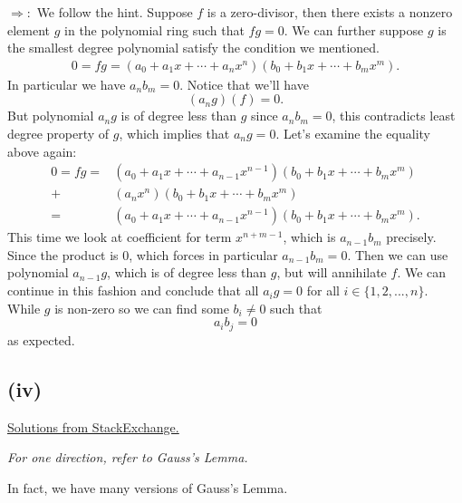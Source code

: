 $\Rightarrow:$ We follow the hint. Suppose $f$ is a zero-divisor, then there exists a nonzero element $g$ in the polynomial ring such that $fg=0$. We can further suppose $g$ is the smallest degree polynomial satisfy the condition we mentioned.
\begin{align*}
    0=fg=(a_0+a_1x+\cdots+a_nx^n)(b_0+b_1x+\cdots+b_mx^m).
\end{align*}In particular we have $a_nb_m=0$. Notice that we'll have 
$$(a_ng)(f)=0.$$ But polynomial $a_ng$ is of degree less than $g$ since $a_nb_m=0$, this contradicts least degree property of $g$, which implies that $a_ng=0$.
Let's examine the equality above again: \begin{align*}
    0=fg=&(a_0+a_1x+\cdots+a_{n-1}x^{n-1})(b_0+b_1x+\cdots+b_mx^m)\\
    +&(a_nx^n)(b_0+b_1x+\cdots+b_mx^m)\\
    =&(a_0+a_1x+\cdots+a_{n-1}x^{n-1})(b_0+b_1x+\cdots+b_mx^m).
\end{align*}This time we look at coefficient for term $x^{n+m-1}$, which is $a_{n-1}b_m$ precisely. Since the product is $0$, which forces in particular $a_{n-1}b_m=0$. Then we can use polynomial $a_{n-1}g$, which is of degree less than $g$, but will annihilate $f$. We can continue in this fashion and conclude that all $a_ig=0$ for all $i\in \{1,2,...,n\}$. While $g$ is non-zero so we can find some $b_i\neq 0$ such that $$a_ib_j=0$$ as expected.

\subsection{(iv)}
\href{https://math.stackexchange.com/questions/688331/exercise-from-atiyah-macdonald-chapter-1-2-iv}{Solutions from StackExchange.}

\textit{For one direction, refer to Gauss's Lemma.}

In fact, we have many versions of Gauss's Lemma.



